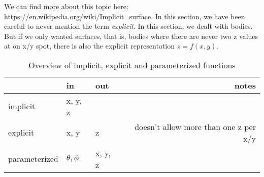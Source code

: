 We can find more about this topic here: https://en.wikipedia.org/wiki/Implicit\_surface. In this section, we have been careful to never mention the term \emph{explicit}. In this section, we dealt with bodies. But if we only wanted surfaces, that is, bodies where there are never two z values at on x/y spot, there is also the explicit representation $z=f(x,y)$.

\begin{table}[H]
\centering
\caption{Overview of implicit, explicit and parameterized functions}
\begin{tabular}{l|ll|r}
              & in         & out     & notes                                 \\
              \hline
implicit      & x, y, z    &         &                                       \\
explicit      & x, y       & z       & doesn't allow more than one z per x/y \\
parameterized & $\theta, \phi$ & x, y, z &                                      
\end{tabular}
\end{table}

%
%
%
% 
%

